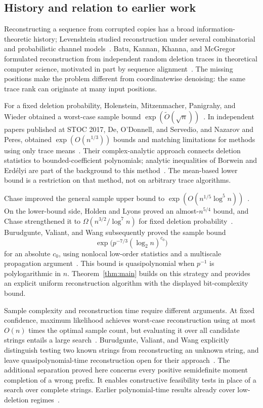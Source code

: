 \subsection{History and relation to earlier work}
Reconstructing a sequence from corrupted copies has a broad information-theoretic
history; Levenshtein studied reconstruction under several combinatorial and
probabilistic channel models~\cite{Levenshtein2001}. Batu, Kannan, Khanna,
and McGregor formulated reconstruction from independent random deletion
traces in theoretical computer science, motivated in part by sequence
alignment~\cite{BKKM2004}. The missing positions make the problem different
from coordinatewise denoising: the same trace rank can originate at many
input positions.

For a fixed deletion probability, Holenstein, Mitzenmacher, Panigrahy, and
Wieder obtained a worst-case sample bound
$\exp(\widetilde O(\sqrt n))$~\cite{HMPW2008}. In independent papers
published at STOC 2017, De, O'Donnell, and Servedio, and Nazarov and Peres,
obtained $\exp(O(n^{1/3}))$ bounds and matching limitations for methods
using only trace means~\cite{DOS2019,NP2017}. Their complex-analytic approach
connects deletion statistics to bounded-coefficient polynomials; analytic
inequalities of Borwein and Erd\'elyi are part of the background to this
method~\cite{BE1997}. The mean-based lower bound is a restriction on that
method, not on arbitrary trace algorithms.

Chase improved the general sample upper bound to
$\exp(O(n^{1/5}\log^5n))$~\cite{Chase2021Upper}. On the lower-bound side,
Holden and Lyons proved an almost-$n^{5/4}$ bound, and Chase strengthened
it to $\Omega(n^{3/2}/\log^7n)$ for fixed deletion
probability~\cite{HoldenLyons2020,Chase2021Lower}.
Burudgunte, Valiant, and Wang subsequently proved the sample bound
\[
 \exp\bigl(p^{-7/3}(\log_2n)^{c_0}\bigr)
\]
for an absolute $c_0$, using nonlocal low-order statistics and a multiscale
propagation argument~\cite[Theorem~43]{BVW2026}. This bound is
quasipolynomial when $p^{-1}$ is polylogarithmic in $n$.
Theorem~\ref{thm:main}
builds on this strategy and provides an explicit uniform reconstruction
algorithm with the displayed bit-complexity bound.

Sample complexity and reconstruction time require different arguments.
At fixed confidence, maximum likelihood achieves worst-case reconstruction
using at most $O(n)$ times the optimal sample count, but evaluating it over
all candidate strings entails a large search~\cite[Corollary~1.1 of the
full version]{CGLSZ2024}. Burudgunte, Valiant, and Wang
explicitly distinguish testing two known strings from reconstructing an
unknown string, and leave quasipolynomial-time reconstruction open for
their approach~\cite[Section~1]{BVW2026}. The additional separation proved
here concerns every positive semidefinite moment completion of a wrong
prefix. It enables constructive feasibility tests in place of a search
over complete strings. Earlier polynomial-time results already cover
low-deletion regimes~\cite{CDLSS2021LowDeletion}.

